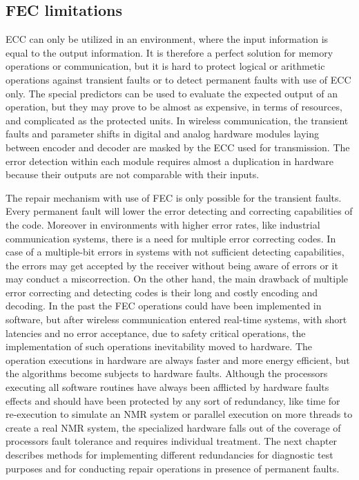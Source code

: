 \subsection{FEC limitations}\label{sub:limits}
ECC can only be utilized in an environment, where the input information is equal to the output information. It is therefore a perfect solution for memory operations or communication, but it is hard to protect logical or arithmetic operations against transient faults or to detect permanent faults with use of ECC only. The special predictors can be used to evaluate the expected output of an operation, but they may prove to be almost as expensive, in terms of resources, and complicated as the protected units. In wireless communication, the transient faults and parameter shifts in digital and analog hardware modules laying between encoder and decoder are masked by the ECC used for transmission. The error detection within each module requires almost a duplication in hardware because their outputs are not comparable with their inputs.

The repair mechanism with use of FEC is only possible for the transient faults. Every permanent fault will lower the error detecting and correcting capabilities of the code. Moreover in environments with higher error rates, like industrial communication systems, there is a need for multiple error correcting codes. In case of a multiple-bit errors in systems with not sufficient detecting capabilities, the errors may get accepted by the receiver without being aware of errors or it may conduct a miscorrection. On the other hand, the main drawback of multiple error correcting and detecting codes is their long and costly encoding and decoding. In the past the FEC operations could have been implemented in software, but after wireless communication entered real-time systems, with short latencies and no error acceptance, due to safety critical operations, the implementation of such operations inevitability moved to hardware. The operation executions in hardware are always faster and more energy efficient, but the algorithms become subjects to hardware faults. Although the processors executing all software routines have always been afflicted by hardware faults effects and should have been protected by any sort of redundancy, like time for re-execution to simulate an NMR system or parallel execution on more threads to create a real NMR system, the specialized hardware falls out of the coverage of processors fault tolerance and requires individual treatment. The next chapter describes methods for implementing different redundancies for diagnostic test purposes and for conducting repair operations in presence of permanent faults.

